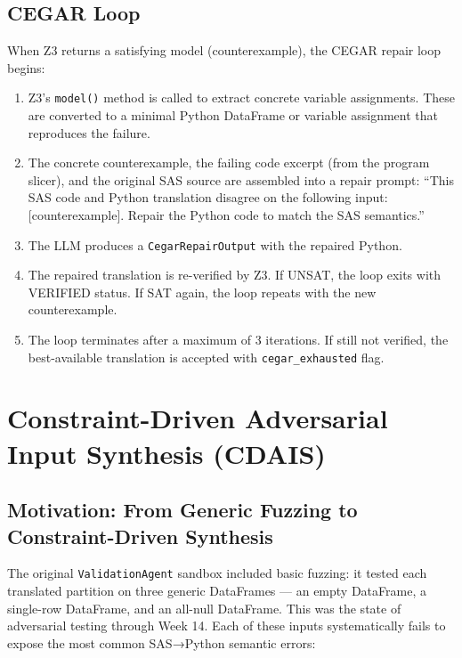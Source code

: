 \subsection{CEGAR Loop}
\label{subsec:cegar-impl}

When Z3 returns a satisfying model (counterexample), the CEGAR repair loop
begins:

\begin{enumerate}
  \item Z3's \texttt{model()} method is called to extract concrete variable
    assignments. These are converted to a minimal Python DataFrame or variable
    assignment that reproduces the failure.
  \item The concrete counterexample, the failing code excerpt (from the program
    slicer), and the original SAS source are assembled into a repair prompt:
    ``This SAS code and Python translation disagree on the following input:
    [counterexample]. Repair the Python code to match the SAS semantics.''
  \item The LLM produces a \texttt{CegarRepairOutput} with the repaired Python.
  \item The repaired translation is re-verified by Z3. If UNSAT, the loop
    exits with VERIFIED status. If SAT again, the loop repeats with the new
    counterexample.
  \item The loop terminates after a maximum of 3 iterations. If still not
    verified, the best-available translation is accepted with
    \texttt{cegar\_exhausted} flag.
\end{enumerate}

\section{Constraint-Driven Adversarial Input Synthesis (CDAIS)}
\label{sec:cdais-impl}

\subsection{Motivation: From Generic Fuzzing to Constraint-Driven Synthesis}
\label{subsec:cdais-motivation}

The original \texttt{ValidationAgent} sandbox included basic fuzzing: it tested
each translated partition on three generic DataFrames --- an empty DataFrame,
a single-row DataFrame, and an all-null DataFrame. This was the state of
adversarial testing through Week 14. Each of these inputs systematically fails
to expose the most common SAS→Python semantic errors:

